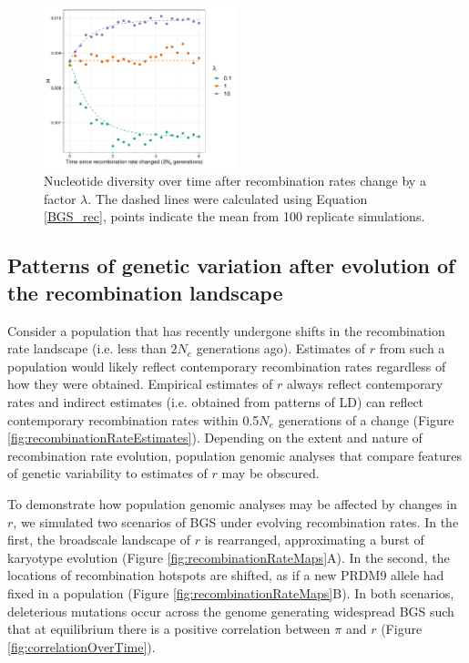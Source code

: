 \documentclass[11pt,twoside, onecolumn]{GSA_format}
\begin{document}
\begin{figure}[H]
\includegraphics[width=0.5\textwidth]{../TheoreticalExpectation/B_over_time_fixed_s_plot_singlePanel}
\caption{Nucleotide diversity over time after recombination rates change by a factor $\lambda$. The dashed lines were calculated using Equation \ref{BGS_rec}, points indicate the mean from 100 replicate simulations.}
\label{fig:BGS_over_time_fixed_s}
\end{figure}

\subsection{Patterns of genetic variation after evolution of the recombination landscape}


Consider a population that has recently undergone shifts in the recombination rate landscape (i.e. less than $2N_e$ generations ago). Estimates of $r$ from such a population would likely reflect contemporary recombination rates regardless of how they were obtained. Empirical estimates of $r$ always reflect contemporary rates and indirect estimates (i.e. obtained from patterns of LD) can reflect contemporary recombination rates within 0.5$N_e$ generations of a change (Figure \ref{fig:recombinationRateEstimates}). Depending on the extent and nature of recombination rate evolution, population genomic analyses that compare features of genetic variability to estimates of $r$ may be obscured. 

\vspace{5px}

To demonstrate how population genomic analyses may be affected by changes in $r$, we simulated two scenarios of BGS under evolving recombination rates. In the first, the broadscale landscape of $r$ is rearranged, approximating a burst of karyotype evolution (Figure \ref{fig:recombinationRateMaps}A). In the second, the locations of recombination hotspots are shifted, as if a new PRDM9 allele had fixed in a population (Figure \ref{fig:recombinationRateMaps}B). In both scenarios, deleterious mutations occur across the genome generating widespread BGS such that at equilibrium there is a positive correlation between $\pi$ and $r$ (Figure \ref{fig:correlationOverTime}).
\end{document}
